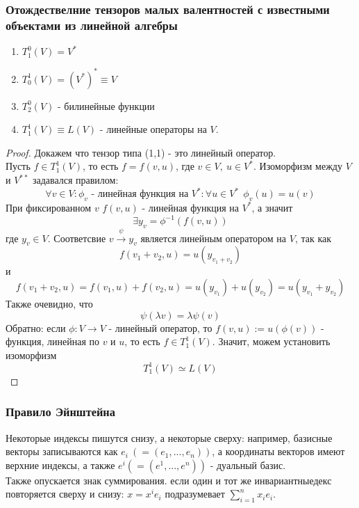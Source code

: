 \subsubsection*{Отождествелние тензоров малых валентностей с известными объектами из линейной алгебры}
\begin{theorem}\tab
    \begin{enumerate}
        \item $T_1^0(V)=V^*$
        \item $T_0^1(V)=(V^*)^* \equiv V$
        \item $T_2^0(V)$ - билинейные функции
        \item $T_1^1(V) \equiv L(V)$ - линейные операторы на $V$.
    \end{enumerate}
\end{theorem} 
\begin{proof}
    Докажем что тензор типа (1,1) - это линейный оператор.\\
    Пусть $f\in T_1^1(V)$, то есть $f=f(v,u)$, где $v\in V,\ u\in V^*$. Изоморфизм между $V$ и $V^{**}$ задавался правилом:
    \[ \forall v\in V: \phi_v \text{ - линейная функция на } V^*: \forall u\in V^*\ \ \phi_v(u)=u(v)\]
    При фиксированном $v$ $f(v,u)$ - линейная функция на $V^*$, а значит
    \[\exists y_v = \phi^{-1}(f(v, u))\]
    где $y_v\in V$. Соответсвие $v\xrightarrow{\psi} y_v$ является линейным оператором на $V$, так как 
    \[f(v_1+v_2,u)=u(y_{v_1+v_2})\]
    и 
    \[f(v_1+v_2,u)=f(v_1,u)+f(v_2,u)=u(y_{v_1})+u(y_{v_2})=u(y_{v_1}+y_{v_2})\]
    Также очевидно, что 
    \[\psi(\lambda v)=\lambda\psi(v)\]
    Обратно: если $\phi: V\to V$ - линейный оператор, то $f(v,u):=u(\phi(v))$ - функция, линейная по $v$ и $u$, то есть $f\in T^1_1(V)$. Значит, можем установить изоморфизм
    \[T_1^1(V)\simeq L(V)\]
\end{proof}  
\subsubsection*{Правило Эйнштейна}
Некоторые индексы пишутся снизу, а некоторые сверху: например, базисные векторы записываются как $e_i \ (= (e_1,...,e_n))$, а координаты векторов имеют верхние индексы, а также $e^i (=(e^1,...,e^n))$ - дуальный базис.\\
Также опускается знак суммирования. если один и тот же инвариантныедекс повторяется сверху и снизу: $x = x^ie_i$ подразумевает $\sum \limits_{i=1}^n x_ie_i$.

